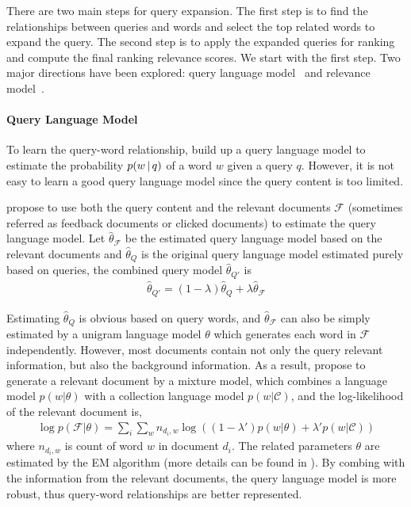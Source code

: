 There are two main steps for query expansion. The first step is to
find the relationships between queries and words and select the top
related words to expand the query. The second step is to apply the
expanded queries for ranking and compute the final ranking relevance
scores. We start with the first step. Two major directions have been
explored: query language model~\citep{zhai-01b} and relevance
model~\citep{Lavrenko-2001}.

\paragraph{Query Language Model}

To learn the query-word relationship, \citet{zhai-01b} build up a query
language model to estimate the probability $p(w \, | \, q)$ of a word $w$
given a query $q$. However, it is not easy to learn a good query
language model since the query content is too limited.

\citet{zhai-01b} propose to use both the query content and the relevant
documents $\mathcal{F}$ (sometimes referred as feedback documents or clicked
documents) to estimate the query language model. Let
$\hat{\theta}_{\mathcal{F}}$ be the estimated query language model
based on the relevant documents and $\hat{\theta}_{Q}$ is the original query language model estimated purely based on queries,
the combined query model $\hat{\theta}_{Q'}$ is
\begin{align}
\label{eq:qlm-comb}
\hat{\theta}_{Q'} = (1 - \lambda)\hat{\theta}_{Q} + \lambda \hat{\theta}_{\mathcal{F}}
\end{align}

Estimating $\hat{\theta}_{Q}$ is obvious based on query words, and $\hat{\theta}_{\mathcal{F}}$ can
also be simply estimated by a unigram language model $\theta$
which generates each word in $\mathcal{F}$ independently. However,
most documents contain not only the query relevant information, but
also the background information. As a result, \citet{zhai-01b} propose
to generate a relevant document by a mixture model, which combines a
language model $p(w|\theta)$ with a collection language model
$p(w|\mathcal{C})$, and the log-likelihood of the relevant document
is,
\begin{align}
\log p(\mathcal{F}|\theta) = \sum_i \sum_w n_{d_i, w} \log((1-\lambda')p(w|\theta) + \lambda' p(w|\mathcal{C}))
\end{align}
where $n_{d_i, w}$ is count of word $w$ in document $d_i$. The related parameters $\theta$ are estimated by the EM algorithm (more details can be found in \citet{zhai-01b}). By combing with the information from the relevant documents, the query language model is more robust, thus query-word relationships are better represented.

